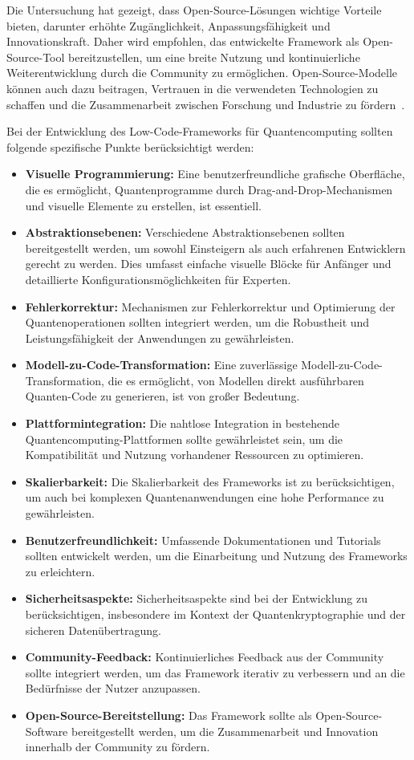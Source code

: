 Die Untersuchung hat gezeigt, dass Open-Source-Lösungen wichtige Vorteile bieten, darunter erhöhte Zugänglichkeit, 
Anpassungsfähigkeit und Innovationskraft. Daher wird empfohlen, das entwickelte Framework als Open-Source-Tool bereitzustellen, 
um eine breite Nutzung und kontinuierliche Weiterentwicklung durch die Community zu ermöglichen. Open-Source-Modelle können 
auch dazu beitragen, Vertrauen in die verwendeten Technologien zu schaffen und die Zusammenarbeit zwischen Forschung und 
Industrie zu fördern~\cite{Cabot_2020}.

Bei der Entwicklung des Low-Code-Frameworks für Quantencomputing sollten folgende spezifische Punkte berücksichtigt werden:

\begin{itemize}
    \item \textbf{Visuelle Programmierung:} Eine benutzerfreundliche grafische Oberfläche, die es ermöglicht, Quantenprogramme 
    durch Drag-and-Drop-Mechanismen und visuelle Elemente zu erstellen, ist essentiell.
    \item \textbf{Abstraktionsebenen:} Verschiedene Abstraktionsebenen sollten bereitgestellt werden, um sowohl Einsteigern 
    als auch erfahrenen Entwicklern gerecht zu werden. Dies umfasst einfache visuelle Blöcke für Anfänger und detaillierte Konfigurationsmöglichkeiten für Experten.
    \item \textbf{Fehlerkorrektur:} Mechanismen zur Fehlerkorrektur und Optimierung der Quantenoperationen sollten integriert 
    werden, um die Robustheit und Leistungsfähigkeit der Anwendungen zu gewährleisten.
    \item \textbf{Modell-zu-Code-Transformation:} Eine zuverlässige Modell-zu-Code-Transformation, die es ermöglicht, von Modellen 
    direkt ausführbaren Quanten-Code zu generieren, ist von großer Bedeutung.
    \item \textbf{Plattformintegration:} Die nahtlose Integration in bestehende Quantencomputing-Plattformen sollte gewährleistet 
    sein, um die Kompatibilität und Nutzung vorhandener Ressourcen zu optimieren.
    \item \textbf{Skalierbarkeit:} Die Skalierbarkeit des Frameworks ist zu berücksichtigen, um auch bei komplexen Quantenanwendungen 
    eine hohe Performance zu gewährleisten.
    \item \textbf{Benutzerfreundlichkeit:} Umfassende Dokumentationen und Tutorials sollten entwickelt werden, um die Einarbeitung und 
    Nutzung des Frameworks zu erleichtern.
    \item \textbf{Sicherheitsaspekte:} Sicherheitsaspekte sind bei der Entwicklung zu berücksichtigen, insbesondere im Kontext der 
    Quantenkryptographie und der sicheren Datenübertragung.
    \item \textbf{Community-Feedback:} Kontinuierliches Feedback aus der Community sollte integriert werden, um das Framework iterativ 
    zu verbessern und an die Bedürfnisse der Nutzer anzupassen.
    \item \textbf{Open-Source-Bereitstellung:} Das Framework sollte als Open-Source-Software bereitgestellt werden, um die 
    Zusammenarbeit und Innovation innerhalb der Community zu fördern.
\end{itemize}

